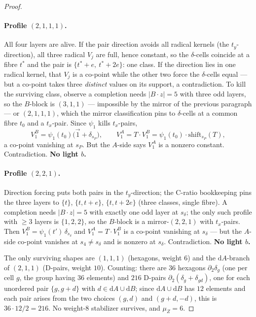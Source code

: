 \documentclass[11pt]{article}
\newcommand{\wt}[1]{\lvert #1\rvert}
\newcommand{\tx}{t_x}
\newcommand{\ty}{t_y}
\theoremstyle{plain}
\theoremstyle{definition}
\theoremstyle{remark}
\begin{document}
\begin{proof}
\paragraph{Profile $(2,1,1,1)$.} All four layers are alive. If the pair direction avoids
all radical kernels (the $\ty$-direction), all three radical $V_j$ are full, hence
constant, so the $\delta$-cells coincide at a fibre $t^\ast$ and the pair is
$\{t^\ast+e,\ t^\ast+2e\}$: one class. If the direction lies in one radical kernel, that
$V_j$ is a co-point while the other two force the $\delta$-cells equal --- but a co-point
takes three \emph{distinct} values on its support, a contradiction. To kill the surviving
class, observe a completion needs $\wt{B\cdot z}=5$ with three odd layers, so the
$B$-block is $(3,1,1)$ --- impossible by the mirror of the previous paragraph --- or
$(2,1,1,1)$, which the mirror classification pins to $\delta$-cells at a common fibre
$t_0$ and a $\tx$-pair. Since $\psi_1$ kills $\tx$-pairs,
\[
  V_1^B=\psi_1(t_0)\bigl(\vec 1+\delta_{s_P}\bigr),\qquad
  V_1^A=T\cdot V_1^B=\psi_1(t_0)\cdot\mathrm{shift}_{s_P}(T),
\]
a co-point vanishing at $s_P$. But the $A$-side says $V_1^A$ is a nonzero constant.
Contradiction. \textbf{No light $b$.}

\paragraph{Profile $(2,2,1)$.} Direction forcing puts both pairs in the $\ty$-direction;
the C-ratio bookkeeping pins the three layers to $\{t\}$, $\{t,t+e\}$, $\{t,t+2e\}$ (three
classes, single fibre). A completion needs $\wt{B\cdot z}=5$ with exactly one odd layer at
$s_\delta$; the only such profile with $\ge 3$ layers is $\{1,2,2\}$, so the $B$-block is a
mirror-$(2,2,1)$ with $\tx$-pairs. Then $V_1^B=\psi_1(t')\,\delta_{s_\delta}$ and
$V_1^A=T\cdot V_1^B$ is a co-point vanishing at $s_\delta$ --- but the $A$-side co-point
vanishes at $s_4\ne s_\delta$ and is nonzero at $s_\delta$. Contradiction.
\textbf{No light $b$.}

\smallskip
The only surviving shapes are $(1,1,1)$ (hexagons, weight $6$) and the $\mathrm dA$-branch
of $(2,1,1)$ (D-pairs, weight $10$). Counting: there are $36$ hexagons $\partial_2\delta_g$
(one per cell $g$, the group having $36$ elements) and $216$ D-pairs
$\partial_2(\delta_g+\delta_{gd})$, one for each unordered pair $\{g,g+d\}$ with
$d\in\mathrm dA\cup\mathrm dB$; since $\mathrm dA\cup\mathrm dB$ has $12$ elements and each
pair arises from the two choices $(g,d)$ and $(g+d,-d)$, this is $36\cdot12/2=216$. No
weight-$8$ stabilizer survives, and $\mu_Z=6$.
\end{proof}
\end{document}
